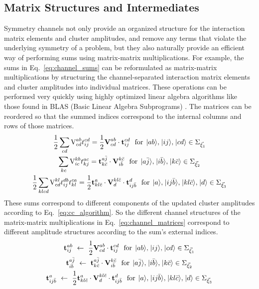 \documentclass[thesis.tex]{subfiles}
\begin{document}
\subsection{Matrix Structures and Intermediates} \label{section:maxtrix_intermediates}

Symmetry channels not only provide an organized structure for the interaction matrix elements and cluster amplitudes, and remove any terms that violate the underlying symmetry of a problem, but they also naturally provide an efficient way of performing sums using matrix-matrix multiplications.  For example, the sums in Eq.\ \eqref{eq:channel_sums} can be reformulated as matrix-matrix multiplications by structuring the channel-separated interaction matrix elements and cluster amplitudes into individual matrices.  These operations can be performed very quickly using highly optimized linear algebra algorithms like those found in BLAS (Basic Linear Algebra Subprograms) \cite{blas}.  The matrices can be reordered so that the summed indices correspond to the internal columns and rows of those matrices.
\begin{gather} \label{eq:channel_matrices}
  \frac{1}{2}\sum\limits_{\mathclap{cd}}\vint{ab}{cd}\tamp{cd}{ij} = \frac{1}{2}\bvint{ab}{cd}\cdot\btamp{cd}{ij}\ \ \text{for}\ \ket{ab},\ket{ij},\ket{cd} \in \Sigma_{\vec{\xi}_{1}} \notag \\
  \sum\limits_{\mathclap{kc}}\vint{kb}{ic}\tamp{ac}{kj} = \btamp{a\bar{j}}{k\bar{c}}\cdot\bvint{k\bar{c}}{i\bar{b}}\ \ \text{for}\ \ket{a\bar{j}},\ket{i\bar{b}},\ket{k\bar{c}} \in \Sigma_{\vec{\xi}_{2}} \notag \\
  \frac{1}{2}\sum\limits_{\mathclap{klcd}}\vint{kl}{cd}\tamp{db}{ij}\tamp{ca}{kl} = \frac{1}{2}\btamp{a}{kl\bar{c}}\cdot\bvint{kl\bar{c}}{d}\cdot\btamp{d}{ij\bar{b}}\ \ \text{for}\ \ket{a},\ket{ij\bar{b}},\ket{kl\bar{c}},\ket{d} \in \Sigma_{\vec{\xi}_{3}}
\end{gather}
These sums correspond to different components of the updated cluster amplitudes according to Eq.\ \eqref{eq:cc_algorithm}.  So the different channel structures of the matrix-matrix multiplications in Eq.\ \eqref{eq:channel_matrices} correspond to different amplitude structures according to the sum's external indices.
\begin{gather} \label{eq:amp_matrices}
  \btamp{ab}{ij}\ \leftarrow\ \frac{1}{2}\bvint{ab}{cd}\cdot\btamp{cd}{ij}\ \ \text{for}\ \ket{ab},\ket{ij},\ket{cd} \in \Sigma_{\vec{\xi}_{1}} \notag \\
  \btamp{a\bar{j}}{i\bar{b}}\ \leftarrow\ \btamp{a\bar{j}}{k\bar{c}}\cdot\bvint{k\bar{c}}{i\bar{b}}\ \ \text{for}\ \ket{a\bar{j}},\ket{i\bar{b}},\ket{k\bar{c}} \in \Sigma_{\vec{\xi}_{2}} \notag \\
  \btamp{a}{ij\bar{b}}\ \leftarrow\ \frac{1}{2}\btamp{a}{kl\bar{c}}\cdot\bvint{kl\bar{c}}{d}\cdot\btamp{d}{ij\bar{b}}\ \ \text{for}\ \ket{a},\ket{ij\bar{b}},\ket{kl\bar{c}},\ket{d} \in \Sigma_{\vec{\xi}_{3}}
\end{gather}
\end{document}
